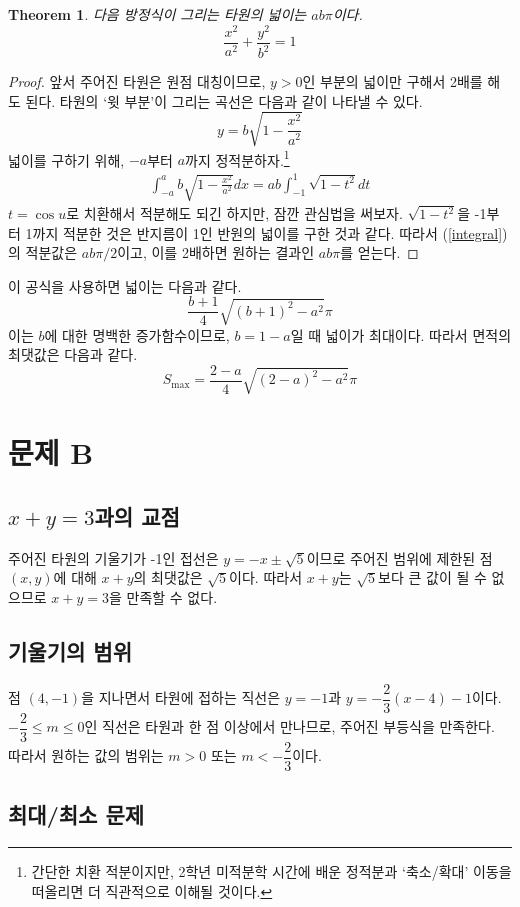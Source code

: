 \documentclass{scrartcl}
\newtheorem{theorem}{Theorem}
\begin{document}
\begin{theorem}
다음 방정식이 그리는 타원의 넓이는 \(ab\pi\)이다.
\[\frac{x^2}{a^2}+\frac{y^2}{b^2}=1\]
\end{theorem}
\begin{proof}
앞서 주어진 타원은 원점 대칭이므로, \(y>0\)인 부분의 넓이만 구해서 2배를 해도 된다. 타원의 `윗 부분'이 그리는 곡선은 다음과 같이 나타낼 수 있다.
\[y=b\sqrt{1-\frac{x^2}{a^2}}\]
넓이를 구하기 위해, \(-a\)부터 \(a\)까지 정적분하자.\footnote{간단한 치환 적분이지만, 2학년 미적분학 시간에 배운 정적분과 `축소/확대' 이동을 떠올리면 더 직관적으로 이해될 것이다.}
\begin{align}\label{integral}\int^a_{-a} b\sqrt{1-\frac{x^2}{a^2}}dx=ab\int^1_{-1}\sqrt{1-t^2}dt\end{align}
\(t=\cos u\)로 치환해서 적분해도 되긴 하지만, 잠깐 관심법을 써보자. \(\sqrt{1-t^2}\)을 -1부터 1까지 적분한 것은 반지름이 1인 반원의 넓이를 구한 것과 같다. 따라서 (\ref{integral})의 적분값은 \(ab\pi/2\)이고, 이를 2배하면 원하는 결과인 \(ab\pi\)를 얻는다.
\end{proof}
이 공식을 사용하면 넓이는 다음과 같다.
\[\frac{b+1}{4}\sqrt{(b+1)^2-a^2}\pi\]
이는 \(b\)에 대한 명백한 증가함수이므로, \(b=1-a\)일 때 넓이가 최대이다. 따라서 면적의 최댓값은 다음과 같다.
\[S_\mathrm{max}=\frac{2-a}{4}\sqrt{(2-a)^2-a^2}\pi\]

\section{문제 B}
\subsection{\(x+y=3\)과의 교점}
주어진 타원의 기울기가 -1인 접선은 \(y=-x\pm\sqrt{5}\)이므로 주어진 범위에 제한된 점 \((x,y)\)에 대해 \(x+y\)의 최댓값은 \(\sqrt{5}\)이다. 따라서 \(x+y\)는 \(\sqrt{5}\)보다 큰 값이 될 수 없으므로 \(x+y=3\)을 만족할 수 없다.

\subsection{기울기의 범위}
점 \((4,-1)\)을 지나면서 타원에 접하는 직선은 \(y=-1\)과 \(y=-\dfrac{2}{3}(x-4)-1\)이다. \(-\dfrac{2}{3}\leq m\leq 0\)인 직선은 타원과 한 점 이상에서 만나므로, 주어진 부등식을 만족한다. 따라서 원하는 값의 범위는 \(m>0\) 또는 \(m<-\dfrac{2}{3}\)이다.

\subsection{최대/최소 문제}
\end{document}
